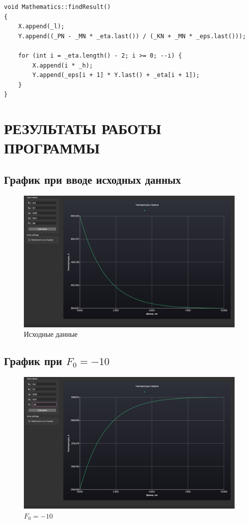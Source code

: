 \begin{lstlisting}[caption=Обратный ход]
void Mathematics::findResult()
{
    X.append(_l);
    Y.append((_PN - _MN * _eta.last()) / (_KN + _MN * _eps.last()));

    for (int i = _eta.length() - 2; i >= 0; --i) {
        X.append(i * _h);
        Y.append(_eps[i + 1] * Y.last() + _eta[i + 1]);
    }
}
\end{lstlisting}

\section{РЕЗУЛЬТАТЫ РАБОТЫ ПРОГРАММЫ}

\subsection{График при вводе исходных данных}

\begin{figure}[H]
    \centering
    \includegraphics[scale=0.35]{img/Default.png}
    \caption{Исходные данные}
\end{figure}

\subsection{График при $F_0 = -10$}

\begin{figure}[H]
    \centering
    \includegraphics[scale=0.35]{img/LessZero.png}
    \caption{$F_0=-10$}
\end{figure}

